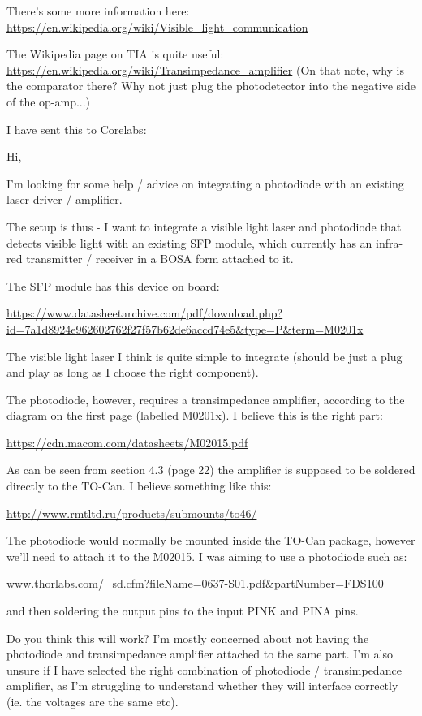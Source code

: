 There's some more information here:
\url{https://en.wikipedia.org/wiki/Visible_light_communication}

The Wikipedia page on TIA is quite useful:
\url{https://en.wikipedia.org/wiki/Transimpedance_amplifier}
(On that note, why is the comparator there? Why not just plug the photodetector
into the negative side of the op-amp...)

I have sent this to Corelabs:

Hi,

I'm looking for some help / advice on integrating a photodiode with an existing laser driver / amplifier.

The setup is thus - I want to integrate a visible light laser and photodiode that detects visible light with an existing SFP module, which currently has an infra-red transmitter / receiver in a BOSA form attached to it.

The SFP module has this device on board:

\url{https://www.datasheetarchive.com/pdf/download.php?id=7a1d8924e962602762f27f57b62de6accd74e5&type=P&term=M0201x}

The visible light laser I think is quite simple to integrate (should be just a plug and play as long as I choose the right component).

The photodiode, however, requires a transimpedance amplifier, according to the diagram on the first page (labelled M0201x). I believe this is the right part:

\url{https://cdn.macom.com/datasheets/M02015.pdf}

As can be seen from section 4.3 (page 22) the amplifier is supposed to be soldered directly to the TO-Can. I believe something like this:

\url{http://www.rmtltd.ru/products/submounts/to46/}

The photodiode would normally be mounted inside the TO-Can package, however we'll need to attach it to the M02015. I was aiming to use a photodiode such as:

\url{www.thorlabs.com/_sd.cfm?fileName=0637-S01.pdf&partNumber=FDS100}

and then soldering the output pins to the input PINK and PINA pins.

Do you think this will work? I'm mostly concerned about not having the photodiode and transimpedance amplifier attached to the same part. I'm also unsure if I have selected the right combination of photodiode / transimpedance amplifier, as I'm struggling to understand whether they will interface correctly (ie. the voltages are the same etc).

